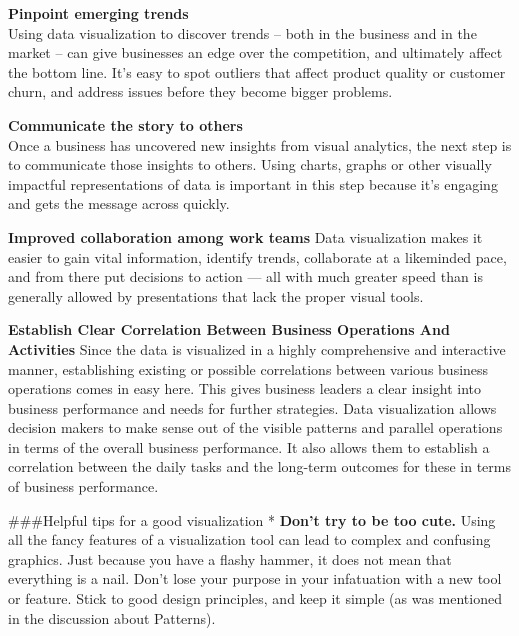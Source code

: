 \documentclass[]{book}
\begin{document}
\textbf{Pinpoint emerging trends}\\
Using data visualization to discover trends -- both in the business and in the market -- can give businesses an edge over the competition, and ultimately affect the bottom line. It's easy to spot outliers that affect product quality or customer churn, and address issues before they become bigger problems.

\textbf{Communicate the story to others}\\
Once a business has uncovered new insights from visual analytics, the next step is to communicate those insights to others. Using charts, graphs or other visually impactful representations of data is important in this step because it's engaging and gets the message across quickly.

\textbf{Improved collaboration among work teams}
Data visualization makes it easier to gain vital information, identify trends, collaborate at a likeminded pace, and from there put decisions to action --- all with much greater speed than is generally allowed by presentations that lack the proper visual tools.

\textbf{Establish Clear Correlation Between Business Operations And Activities}
Since the data is visualized in a highly comprehensive and interactive manner, establishing existing or possible correlations between various business operations comes in easy here. This gives business leaders a clear insight into business performance and needs for further strategies.
Data visualization allows decision makers to make sense out of the visible patterns and parallel operations in terms of the overall business performance. It also allows them to establish a correlation between the daily tasks and the long-term outcomes for these in terms of business performance.

\#\#\#Helpful tips for a good visualization
* \textbf{Don't try to be too cute.} Using all the fancy features of a visualization tool can lead to complex and confusing graphics. Just because you have a flashy hammer, it does not mean that everything is a nail. Don't lose your purpose in your infatuation with a new tool or feature. Stick to good design principles, and keep it simple (as was mentioned in the discussion about Patterns).
\end{document}
